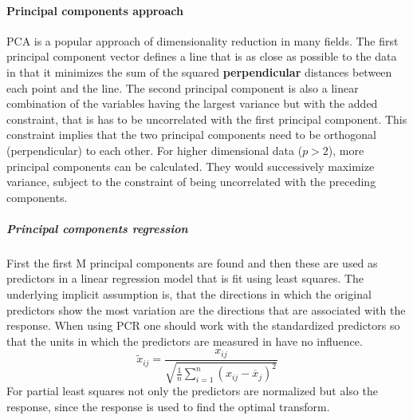 \documentclass[../document.tex]{subfiles}
\begin{document}
	\paragraph{Principal components approach}
	PCA is a popular approach of dimensionality reduction in many fields. The first principal component vector defines a line that is as close as possible to the data in that it minimizes the sum of the squared \textbf{perpendicular} distances between each point and the line. The second principal component is also a linear combination of the variables having the largest variance but with the added constraint, that is has to be uncorrelated with the first principal component. This constraint implies that the two principal components need to be orthogonal (perpendicular) to each other. For higher dimensional data (\(p>2\)), more principal components can be calculated. They would successively maximize variance, subject to the constraint of being uncorrelated with the preceding components.
	\subparagraph{Principal components regression}
	First the first M principal components are found and then these are used as predictors in a linear regression model that is fit using least squares. The underlying implicit assumption is, that the directions in which the original predictors show the most variation are the directions that are associated with the response. When using PCR one should work with the standardized predictors so that the units in which the predictors are measured in have no influence.
	\begin{equation}
		\tilde{x}_{ij}=\frac{x_{ij}}{\sqrt{\frac{1}{n}\sum_{i=1}^{n}(x_{ij}-\overline{x}_{j})^2}}
	\end{equation}
	For partial least squares not only the predictors are normalized but also the response, since the response is used to find the optimal transform.
\end{document}
